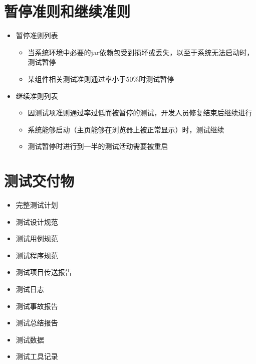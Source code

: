 \documentclass[hyperref, a4paper]{ctexart}
\providecommand{\tightlist}{%
  \setlength{\itemsep}{0pt}\setlength{\parskip}{0pt}}
\begin{document}
\hypertarget{ux6682ux505cux51c6ux5219ux548cux7ee7ux7eedux51c6ux5219}{%
\section{暂停准则和继续准则}\label{ux6682ux505cux51c6ux5219ux548cux7ee7ux7eedux51c6ux5219}}

\begin{itemize}
\tightlist
\item
  暂停准则列表

  \begin{itemize}
  \tightlist
  \item
    当系统环境中必要的jar依赖包受到损坏或丢失，以至于系统无法启动时，测试暂停
  \item
    某组件相关测试准则通过率小于50\%时测试暂停
  \end{itemize}
\item
  继续准则列表

  \begin{itemize}
  \tightlist
  \item
    因测试项准则通过率过低而被暂停的测试，开发人员修复结束后继续进行
  \item
    系统能够启动（主页能够在浏览器上被正常显示）时，测试继续
  \item
    测试暂停时进行到一半的测试活动需要被重启
  \end{itemize}
\end{itemize}

\hypertarget{ux6d4bux8bd5ux4ea4ux4ed8ux7269}{%
\section{测试交付物}\label{ux6d4bux8bd5ux4ea4ux4ed8ux7269}}

\begin{itemize}
\tightlist
\item
  完整测试计划
\item
  测试设计规范
\item
  测试用例规范
\item
  测试程序规范
\item
  测试项目传送报告
\item
  测试日志
\item
  测试事故报告
\item
  测试总结报告
\item
  测试数据
\item
  测试工具记录
\end{itemize}
\end{document}
